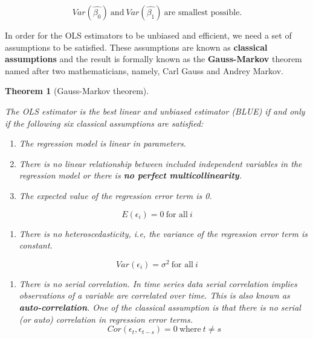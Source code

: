 \documentclass[
]{book}
\providecommand{\tightlist}{%
  \setlength{\itemsep}{0pt}\setlength{\parskip}{0pt}}
\newtheorem{theorem}{Theorem}[chapter]
\theoremstyle{definition}
\theoremstyle{definition}
\theoremstyle{definition}
\theoremstyle{definition}
\theoremstyle{remark}
\begin{document}
\[Var(\hat{\beta_0}) \ \text{and} \ Var(\hat{\beta_1}) \ \text{are smallest possible.} \]

In order for the OLS estimators to be unbiased and efficient, we need a set of assumptions to be satisfied. These assumptions are known as \textbf{classical assumptions} and the result is formally known as the \textbf{Gauss-Markov} theorem named after two mathematicians, namely, Carl Gauss and Andrey Markov.

\begin{theorem}[Gauss-Markov theorem]
\protect\hypertarget{thm:unnamed-chunk-33}{}\label{thm:unnamed-chunk-33}

The OLS estimator is the best linear and unbiased estimator (BLUE) if and only if the following six classical assumptions are satisfied:

\begin{enumerate}
\def\labelenumi{\arabic{enumi}.}
\item
  The regression model is linear in parameters.
\item
  There is no linear relationship between included independent variables in the regression model or there is \textbf{no perfect multicollinearity}.
\item
  The expected value of the regression error term is 0.
\end{enumerate}

\[E(\epsilon_i)=0 \ \text{for all} \ i\]

\begin{enumerate}
\def\labelenumi{\arabic{enumi}.}
\setcounter{enumi}{3}
\tightlist
\item
  There is no heteroscedasticity, i.e, the variance of the regression error term is constant.
\end{enumerate}

\[Var(\epsilon_i)=\sigma^2 \ \text{for all} \ i\]

\begin{enumerate}
\def\labelenumi{\arabic{enumi}.}
\setcounter{enumi}{4}
\tightlist
\item
  There is no serial correlation. In time series data serial correlation implies observations of a variable are correlated over time. This is also known as \textbf{auto-correlation}. One of the classical assumption is that there is no serial (or auto) correlation in regression error terms.\[Cor(\epsilon_t, \epsilon_{t-s})=0 \ \text{where} \ t\neq s\]
\end{enumerate}

\end{theorem}
\end{document}
